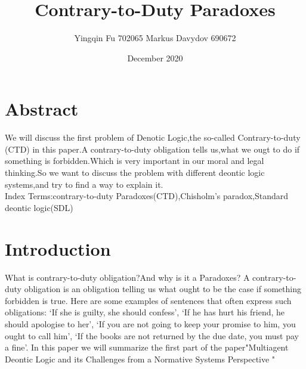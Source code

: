 \documentclass{article}
\title{Contrary-to-Duty Paradoxes}
\author{Yingqin Fu 702065 Markus Davydov 690672 }
\date{December 2020}
\begin{document}
\maketitle
\tableofcontents
\section*{Abstract}
We will discuss the first problem of Denotic Logic,the so-called Contrary-to-duty (CTD) in this paper.A contrary-to-duty obligation tells us,what we ougt to do if something is forbidden.Which is very important in our moral and legal thinking.So we want to discuss the problem with different deontic logic systems,and try to find a way to explain it.\\
Index Terms:contrary-to-duty Paradoxes(CTD),Chisholm’s paradox,Standard deontic logic(SDL)
\section*{Introduction}
What is contrary-to-duty obligation?And why is it a Paradoxes? A contrary-to-duty obligation is an obligation telling us what ought to be the case if something forbidden is true. Here are some examples of sentences that often express such obligations: ‘If she is guilty, she should confess’, ‘If he has hurt his friend, he should apologise to her’, ‘If you are not going to keep your promise to him, you ought to call him’, ‘If the books are not returned by the due date, you must pay a fine’. In this paper we will summarize the first part of the paper"Multiagent Deontic Logic and its Challenges from a Normative Systems Perspective "\cite{1} 
\end{document}
